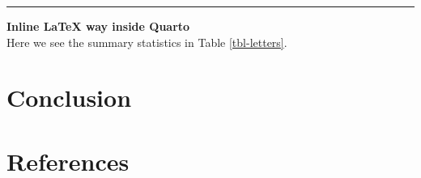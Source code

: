 \documentclass[
  12pt,
  a4paper,
  openany]{scrbook}
\begin{document}
\begin{center}\rule{0.5\linewidth}{0.5pt}\end{center}

\textbf{Inline LaTeX way inside Quarto}\\
Here we see the summary statistics in Table \ref{tbl-letters}.

\begin{table}

\caption{\label{tbl-letters}Some letters with LaTeX}


\end{table}%


\chapter{Conclusion}\label{conclusion}


\chapter*{References}\label{references}

\end{document}

